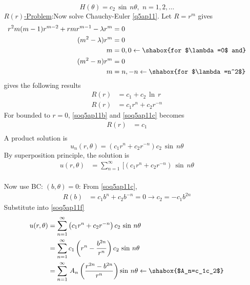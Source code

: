 \begin{equation}
H(\theta)=c_2\,\sin\,n\theta,\,\,n=1,2,\ldots\label{soq5ap11a}
\end{equation}
\underline{$R(r)$-Problem}:Now solve Chauchy-Euler \eqref{q5ap11}. Let $R=r^m$ gives
\begin{align*}
r^2m(m-1)r^{m-2}+rmr^{m-1}-\lambda r^m&=0\\
(m^2-\lambda)r^m&=0\\
m&=0,0\leftarrow\shabox{for $\lambda=0$ and}\\
(m^2-n)r^m&=0\\
m&=n,-n\leftarrow\shabox{for $\lambda=n^2$}
\end{align*}
gives the following results
\begin{align}
R(r)&=c_1+c_2\,\ln\,r\label{soq5ap11b}\\
R(r)&=c_1r^n+c_2r^{-n}\label{soq5ap11c}
\end{align}
For bounded to $r=0$, \eqref{soq5ap11b} and \eqref{soq5ap11c} becomes
\begin{align}
R(r)&=c_1\label{soq5ap11d}\\
\end{align}
A product solution is
\begin{equation}
u_n(r,\theta)=(c_1r^n+c_2r^{-n})c_2\,\sin\,n\theta
\end{equation}
By superposition principle, the solution is
\begin{align}
u(r,\theta)&=\sum_{n=1}^\infty\,[(c_1r^n+c_2r^{-n})\,\sin\,n\theta\label{soq5ap11f}
\end{align}
\\
Now use BC: $(b,\theta)=0$:
From \eqref{soq5ap11c},
\begin{align*}
R(b)&=c_1b^n+c_2b^{-n}=0\to c_2=-c_1b^{2n}
\end{align*}
Substitute into \eqref{soq5ap11f}
\begin{align}
u(r,\theta)&=\sum_{n=1}^\infty\left(c_1r^n+c_2r^{-n}\right)c_2\,\sin\,n\theta\\
&=\sum_{n=1}^\infty c_1\left(r^n-\frac{b^{2n}}{r^n}\right)c_2\,\sin\,n\theta\\
&=\sum_{n=1}^\infty\,A_n\left(\frac{r^{2n}-b^{2n}}{r^n}\right)\sin\,n\theta\leftarrow\shabox{$A_n=c_1c_2$}\label{saa1}
\end{align}
